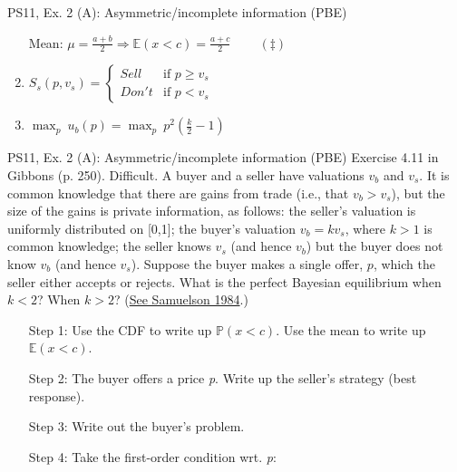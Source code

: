 \begin{frame}{PS11, Ex. 2 (A): Asymmetric/incomplete information (PBE)}
\begin{multicols}{2}
\begin{enumerate}
        \item[Mean:] $\mu=\frac{a+b}{2}\Rightarrow\mathbb{E}(x<c)=\frac{a+c}{2}\quad\quad\ (\ddagger)$
        \item $S_s(p,v_s)=\left\{\begin{array}{ll}
          Sell  & \text{if }p\geq v_s \\
          Don't & \text{if }p < v_s
        \end{array}\right.$
        \item $\displaystyle{\max_p}\ u_b(p)=\displaystyle{\max_p}\ p^2\left(\frac{k}{2}-1\right)$
      \end{enumerate}
      \vfill\null
    \end{multicols}
\end{frame}
\begin{frame}{PS11, Ex. 2 (A): Asymmetric/incomplete information (PBE)}
    Exercise 4.11 in Gibbons (p. 250). Difficult. A buyer and a seller have valuations $v_b$ and $v_s$. It is common knowledge that there are gains from trade (i.e., that $v_b > v_s$), but the size of the gains is private information, as follows: the seller’s valuation is uniformly distributed on [0,1]; the buyer’s valuation $v_b = kv_s$, where $k > 1$ is common knowledge; the seller knows $v_s$ (and hence $v_b$) but the buyer does not know $v_b$ (and hence $v_s$). Suppose the buyer makes a single offer, $p$, which the seller either accepts or rejects. What is the perfect Bayesian equilibrium when $k < 2$? When $k > 2$? (\href{https://www.jstor.org/stable/1911195}{See Samuelson 1984}.) \vspace{-8pt}
    \begin{multicols}{2}
      \begin{itemize}
        \item[Step 1:] Use the CDF to write up $\mathbb{P}(x<c)$. Use the mean to write up $\mathbb{E}(x<c)$.
        \item[Step 2:] \vspace{-2pt} The buyer offers a price \textit{p}. Write up the seller's strategy (best response).
        \item[Step 3:] \vspace{-2pt} Write out the buyer's problem.
        \item[Step 4:] \vspace{-2pt} Take the first-order condition wrt. \textit{p}:
      \end{itemize} \vspace{-14pt}
      \begin{align*}

\end{align*}
\end{multicols}
\end{frame}
